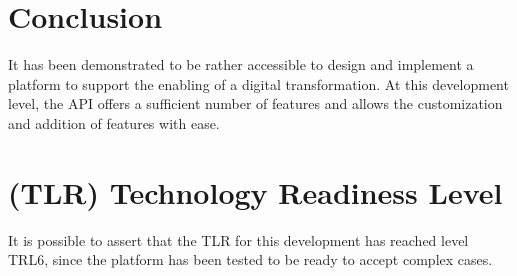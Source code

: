 \documentclass[12pt]{report}
\begin{document}
\section{Conclusion}

It has been demonstrated to be rather accessible to design and implement a platform to support the enabling of a digital transformation. At this development level, the API offers a sufficient number of features and allows the customization and addition of features with ease.

\section{(TLR) Technology Readiness Level}
It is possible to assert that the TLR for this development has reached level TRL6, since the platform has been tested to be ready to accept complex cases.
\end{document}
